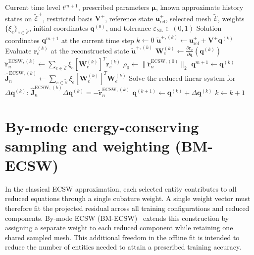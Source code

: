 \documentclass[a4paper,12pt]{article}
\newcommand{\vect}[1]{\boldsymbol{#1}}
\newcommand{\matr}[1]{\boldsymbol{#1}}
\begin{document}
\begin{algorithm}[H]
 \caption{Online solution of HPROM (ECSW)}
 \label{alg:classical-online}
 \small
 \begin{algorithmic}[1]
  \setlength{\itemsep}{2pt}
  \Require Current time level $t^{m+1}$, prescribed parameters $\vect{\mu}$, known approximate history states on $\widetilde{\mathcal E}^{+}$, restricted basis $\matr{V}^+$, reference state $\vect{u}_{\mathrm{ref}}^+$, selected mesh $\widetilde{\mathcal E}$, weights $\{\xi_e\}_{e\in\widetilde{\mathcal E}}$, initial coordinates $\vect{q}^{(0)}$, and tolerance $\varepsilon_{\mathrm{NL}}\in(0,1)$
  \Ensure Solution coordinates $\vect{q}^{m+1}$ at the current time step
  \State $k\gets0$
  \Loop
   \State $\widetilde{\vect{u}}^{+,(k)}\gets\vect{u}_{\mathrm{ref}}^++\matr{V}^+\vect{q}^{(k)}$
    \State Evaluate $\vect{r}_e^{(k)}$ at the reconstructed state $\widetilde{\vect{u}}^{+,(k)}$
    \State $\matr{W}_e^{(k)}\gets\displaystyle\frac{\partial\vect{r}_e}{\partial\vect{q}}(\vect{q}^{(k)})$
   \EndFor
   \State $\widetilde{\vect{r}}_n^{\mathrm{ECSW},(k)}\gets
      \sum_{e\in\widetilde{\mathcal E}}\xi_e[\matr{W}_e^{(k)}]^T\vect{r}_e^{(k)}$
    \State $\rho_0\gets\|\widetilde{\vect{r}}_n^{\mathrm{ECSW},(0)}\|_2$
   \EndIf
   \If{$\|\widetilde{\vect{r}}_n^{\mathrm{ECSW},(k)}\|_2\leq\varepsilon_{\mathrm{NL}}\rho_0$}
    \State \Return $\vect{q}^{m+1}\gets\vect{q}^{(k)}$
   \EndIf
   \State $\widehat{\matr{J}}_n^{\mathrm{ECSW},(k)}\gets
      \sum_{e\in\widetilde{\mathcal E}}\xi_e[\matr{W}_e^{(k)}]^T\matr{W}_e^{(k)}$
   \State Solve the reduced linear system for $\Delta\vect{q}^{(k)}$:
   \Statex \hspace{\algorithmicindent}$\displaystyle
      \widehat{\matr{J}}_n^{\mathrm{ECSW},(k)}\Delta\vect{q}^{(k)}
      =-\widetilde{\vect{r}}_n^{\mathrm{ECSW},(k)}$
   \State $\vect{q}^{(k+1)}\gets\vect{q}^{(k)}+\Delta\vect{q}^{(k)}$
   \State $k\gets k+1$
  \EndLoop
 \end{algorithmic}
\end{algorithm}


\section{By-mode energy-conserving sampling and weighting (BM-ECSW)}
\label{sec:bm}

In the classical ECSW approximation, each selected entity contributes to all reduced equations through a single cubature weight. A single weight vector must therefore fit the projected residual across all training configurations and reduced components. By-mode ECSW (BM-ECSW)~\cite{rodriguez2026proposal} extends this construction by assigning a separate weight to each reduced component while retaining one shared sampled mesh. This additional freedom in the offline fit is intended to reduce the number of entities needed to attain a prescribed training accuracy.
\end{document}
